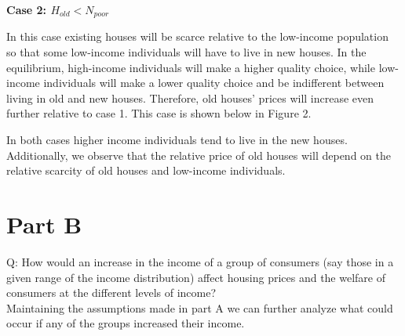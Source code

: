 \documentclass[12pt]{paper}
\begin{document}
\newpage

\textbf{Case 2: $H_{old} < N_{poor}$}

In this case existing houses will be scarce relative to the low-income population so that some low-income individuals will have to live in new houses. In the equilibrium, high-income individuals will make a higher quality choice, while low-income individuals will make a lower quality choice and be indifferent between living in old and new houses. Therefore, old houses' prices will increase even further relative to case 1. This case is shown below in Figure 2.
\\

\begin{figure}[h!]
  \centering
{}
\end{figure}

In both cases higher income individuals tend to live in the new houses. Additionally, we observe that the relative price of old houses will depend on the relative scarcity of old houses and low-income individuals.

\section{Part B}
Q: How would an increase in the income of a group of consumers (say
those in a given
range of the income distribution) affect housing
prices and the welfare of consumers at
the different levels of
income?
\\

Maintaining the assumptions made in part A we can further analyze what
could occur if any of the groups increased their income.
\\
\end{document}
